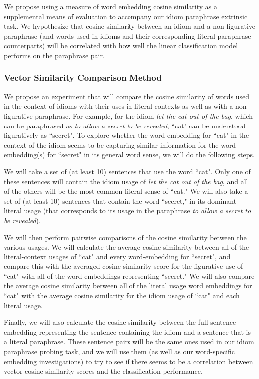 \documentclass[11pt,a4paper]{article}
\begin{document}
 We propose using a measure of word embedding cosine similarity as a supplemental means of evaluation to accompany our idiom paraphrase extrinsic task. We hypothesize that cosine similarity between an idiom and a non-figurative paraphrase (and words used in idioms and their corresponding literal paraphrase counterparts) will be correlated with how well the linear classification model performs on the paraphrase pair.
 
 \subsubsection{Vector Similarity Comparison Method}
 
 We propose an experiment that will compare the cosine similarity of words used in the context of idioms with their uses in literal contexts as well as with a non-figurative paraphrase. For example, for the idiom \textit{let the cat out of the bag}, which can be paraphrased as \textit{to allow a secret to be revealed}, ``cat" can be understood figuratively as ``secret". To explore whether the word embedding for ``cat" in the context of the idiom seems to be capturing similar information for the word embedding(s) for ``secret" in its general word sense, we will do the following steps. 
 
 We will take a set of (at least 10) sentences that use the word ``cat".  Only one of these sentences will contain the idiom usage of \textit{let the cat out of the bag}, and all of the others will be the most common literal sense of ``cat." We will also take a set of (at least 10) sentences that contain the word ``secret," in its dominant literal usage (that corresponds to its usage in the paraphrase \textit{to allow a secret to be revealed}). 

 
 We will then perform pairwise comparisons of the cosine similarity between the various usages. We will calculate the average cosine similarity between all of the literal-context usages of ``cat" and every word-embedding for ``secret", and compare this with the averaged cosine similarity score for the figurative use of ``cat" with all of the  word embeddings representing ``secret." We will also compare the average cosine similarity between all of the literal usage word embeddings for ``cat" with the average cosine similarity for the idiom usage of ``cat" and each literal usage.
 
 Finally, we will also calculate the cosine similarity between the full sentence embedding representing the sentence containing the idiom and a sentence that is a literal paraphrase. These sentence pairs will be the same ones used in our idiom paraphrase probing task, and we will use them (as well as our word-specific embedding investigations) to try to see if there seems to be a correlation between vector cosine similarity scores and the classification performance.
\end{document}

